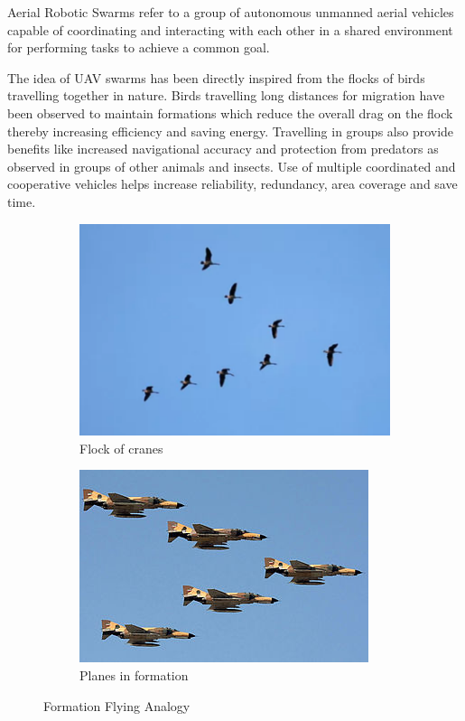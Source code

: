 \begin{spacing}{2}
Aerial Robotic Swarms refer to a group of autonomous unmanned aerial vehicles capable of coordinating and interacting with each other in a shared environment for performing tasks to achieve a common goal.

The idea of UAV swarms has been directly inspired from the flocks of birds travelling together in nature. Birds travelling long distances for migration have been observed to maintain formations which reduce the overall drag on the flock thereby increasing efficiency and saving energy. Travelling in groups also provide benefits like increased navigational accuracy and protection from predators as observed in groups of other animals and insects.
Use of multiple coordinated and cooperative vehicles helps increase reliability, redundancy, area coverage and save time.
\begin{figure}[h]
\begin{subfigure}{0.49\linewidth}
\includegraphics[width = \linewidth]{image/birdflock.png}
\caption{Flock of cranes}
\end{subfigure}
\begin{subfigure}{0.5\linewidth}
\includegraphics[width = \linewidth, trim=30 30 30 30,clip]{image/planeformation1.jpg}
\caption{Planes in formation}
\end{subfigure}
\caption{Formation Flying Analogy}
\label{fig:flock analogy}
\end{figure}


\end{spacing}
